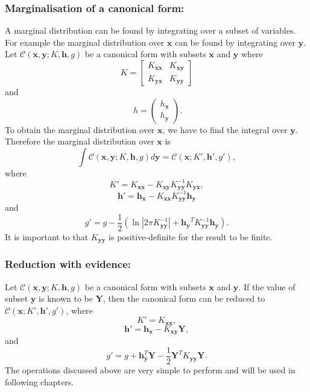 \documentclass[12pt,oneside,openany,a4paper, %
afrikaans,english,
]{memoir}
\numberwithin{equation}{chapter}
\begin{document}
\subsubsection{Marginalisation of a canonical form:}
A marginal distribution can be found by integrating over a subset of variables. For example the marginal distribution over $\bm{x}$ can be found by integrating over $\bm{y}$. Let $\mathcal{C}(\bm{x},\bm{y};K,\bm{h},g)$ be a canonical form with subsets $\bm{x}$ and $\bm{y}$ where
\begin{equation}
K = 
\begin{bmatrix}
K_{\bm{xx}} & K_{\bm{xy}}\\
K_{\bm{yx}} & K_{\bm{yy}}
\end{bmatrix}
\end{equation}
and
\begin{equation}
\ h = 
\begin{pmatrix}
h_{\bm{x}} \\
h_{\bm{y}}
\end{pmatrix}.
\end{equation}
To obtain the marginal distribution over $\bm{x}$, we have to find the integral over $\bm{y}$. Therefore the marginal distribution over $\bm{x}$ is
\begin{equation}
\int\mathcal{C}(\bm{x},\bm{y};K,\bm{h},g)d\bm{y} = \mathcal{C}(\bm{x};K',\bm{h}',g'),
\end{equation}
 where
\begin{equation}
K' = K_{\bm{xx}} - K_{\bm{xy}}K_{\bm{yy}}^{-1}K_{\bm{yx}},
\end{equation}
\begin{equation}
\bm{h'} = \bm{h}_{\bm{x}} - K_{\bm{xx}}K_{\bm{yy}}^{-1}\bm{h}_{\bm{y}}
\end{equation}
and
\begin{equation}
g' = g - \frac{1}{2}\left(\ln|2\pi K_{\bm{yy}}^{-1}|+ \bm{h_y}^T K_{\bm{yy}}^{-1}\bm{h_y}\right).
\end{equation}
It is important to that $K_{\bm{yy}}$ is positive-definite for the result to be finite.
\subsubsection{Reduction with evidence:}
Let $\mathcal{C}(\bm{x},\bm{y};K,\bm{h},g)$ be a canonical form with subsets $\bm{x}$ and $\bm{y}$. If the value of subset $\bm{y}$ is known to be $\bm{Y}$, then the canonical form can be reduced to $\mathcal{C}(\bm{x}; K',\bm{h}',g')$, where
\begin{equation}
K' = K_{\bm{xx}},
\end{equation}
\begin{equation}
\bm{h'} = \bm{h}_{\bm{x}} - K_{\bm{xy}}\bm{Y},
\end{equation}
and
\begin{equation}
g' = g + \bm{h}_{\bm{y}}^T\bm{Y} - \frac{1}{2}\bm{Y}^TK_{\bm{yy}}\bm{Y}.
\end{equation}
The operations discussed above are very simple to perform and will be used in following chapters.
\end{document}
